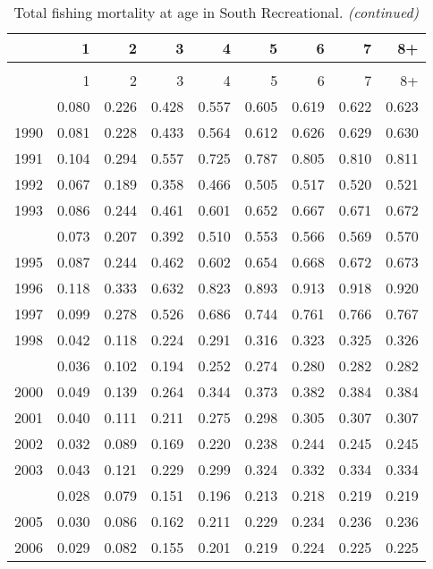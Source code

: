\documentclass[
]{article}
\begin{document}
\begin{longtable}[t]{lrrrrrrrr}
\caption{\label{tab:South_Recreational-fleet-FAA-table}Total fishing mortality at age in South Recreational.}\\
\toprule
  & 1 & 2 & 3 & 4 & 5 & 6 & 7 & 8+\\
\midrule
\endfirsthead
\caption[]{Total fishing mortality at age in South Recreational. \textit{(continued)}}\\
\toprule
  & 1 & 2 & 3 & 4 & 5 & 6 & 7 & 8+\\
\midrule
\endhead

\endfoot
\bottomrule
\endlastfoot
1989 & 0.080 & 0.226 & 0.428 & 0.557 & 0.605 & 0.619 & 0.622 & 0.623\\
1990 & 0.081 & 0.228 & 0.433 & 0.564 & 0.612 & 0.626 & 0.629 & 0.630\\
1991 & 0.104 & 0.294 & 0.557 & 0.725 & 0.787 & 0.805 & 0.810 & 0.811\\
1992 & 0.067 & 0.189 & 0.358 & 0.466 & 0.505 & 0.517 & 0.520 & 0.521\\
1993 & 0.086 & 0.244 & 0.461 & 0.601 & 0.652 & 0.667 & 0.671 & 0.672\\
\addlinespace
1994 & 0.073 & 0.207 & 0.392 & 0.510 & 0.553 & 0.566 & 0.569 & 0.570\\
1995 & 0.087 & 0.244 & 0.462 & 0.602 & 0.654 & 0.668 & 0.672 & 0.673\\
1996 & 0.118 & 0.333 & 0.632 & 0.823 & 0.893 & 0.913 & 0.918 & 0.920\\
1997 & 0.099 & 0.278 & 0.526 & 0.686 & 0.744 & 0.761 & 0.766 & 0.767\\
1998 & 0.042 & 0.118 & 0.224 & 0.291 & 0.316 & 0.323 & 0.325 & 0.326\\
\addlinespace
1999 & 0.036 & 0.102 & 0.194 & 0.252 & 0.274 & 0.280 & 0.282 & 0.282\\
2000 & 0.049 & 0.139 & 0.264 & 0.344 & 0.373 & 0.382 & 0.384 & 0.384\\
2001 & 0.040 & 0.111 & 0.211 & 0.275 & 0.298 & 0.305 & 0.307 & 0.307\\
2002 & 0.032 & 0.089 & 0.169 & 0.220 & 0.238 & 0.244 & 0.245 & 0.245\\
2003 & 0.043 & 0.121 & 0.229 & 0.299 & 0.324 & 0.332 & 0.334 & 0.334\\
\addlinespace
2004 & 0.028 & 0.079 & 0.151 & 0.196 & 0.213 & 0.218 & 0.219 & 0.219\\
2005 & 0.030 & 0.086 & 0.162 & 0.211 & 0.229 & 0.234 & 0.236 & 0.236\\
2006 & 0.029 & 0.082 & 0.155 & 0.201 & 0.219 & 0.224 & 0.225 & 0.225\\

\end{longtable}
\end{document}
